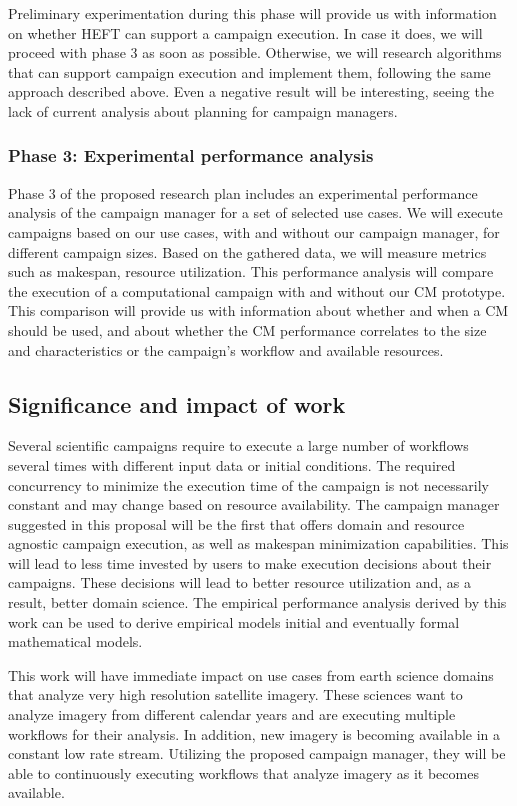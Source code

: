 Preliminary experimentation during this phase will provide us with information on whether HEFT can support a campaign execution.
In case it does, we will proceed with phase 3 as soon as possible.
Otherwise, we will research algorithms that can support campaign execution and implement them, following the same approach described above. Even a negative result will be interesting, seeing the lack of current analysis about planning for campaign managers.

\subsubsection{Phase 3: Experimental performance analysis}
\label{obj3}
Phase 3 of the proposed research plan includes an experimental performance analysis of the campaign manager for a set of selected use cases.
We will execute campaigns based on our use cases, with and without our campaign manager, for different campaign sizes.
Based on the gathered data, we will measure metrics such as makespan, resource utilization.
This performance analysis will compare the execution of a computational campaign with and without our CM prototype.
This comparison will provide us with information about whether and when a CM should be used, and about whether the CM performance correlates to the size and characteristics or the campaign's workflow and available resources.

\subsection{Significance and impact of work}
Several scientific campaigns require to execute a large number of workflows several times with different input data or initial conditions. 
The required concurrency to minimize the execution time of the campaign is not necessarily constant and may change based on resource availability. 
The campaign manager suggested in this proposal will be the first that offers domain and resource agnostic campaign execution, as well as makespan minimization capabilities. 
This will lead to less time invested by users to make execution decisions about their campaigns. 
These decisions will lead to better resource utilization and, as a result, better domain science. 
The empirical performance analysis derived by this work can be used to derive empirical models initial and eventually formal mathematical models.

This work will have immediate impact on use cases from earth science domains that analyze very high resolution satellite imagery.
These sciences want to analyze imagery from different calendar years and are executing multiple workflows for their analysis.
In addition, new imagery is becoming available in a constant low rate stream.
Utilizing the proposed campaign manager, they will be able to continuously executing workflows that analyze imagery as it becomes available.


